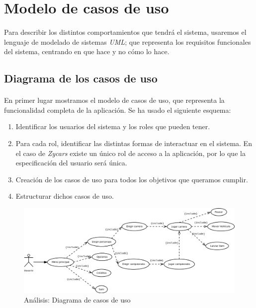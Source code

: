 \section{Modelo de casos de uso}

\paragraph{}
Para describir los distintos comportamientos que tendrá el sistema, usaremos el lenguaje de modelado de sistemas \emph{UML}; que
representa los requisitos funcionales del sistema, centrando en que hace y no cómo lo hace.

\subsection{Diagrama de los casos de uso}

\paragraph{}
En primer lugar mostramos el modelo de casos de uso, que representa la funcionalidad completa de la aplicación. Se ha usado el 
siguiente esquema:

\begin{enumerate}
    \item Identificar los usuarios del sistema y los roles que pueden tener.
    \item Para cada rol, identificar las distintas formas de interactuar en el sistema. En el caso de \emph{Zycars} existe
    un único rol de acceso a la aplicación, por lo que la especificación del usuario será única.
    \item Creación de los casos de uso para todos los objetivos que queramos cumplir.
    \item Estructurar dichos casos de uso.
\end{enumerate}

\begin{figure}[H]
  \label{diagrama_casos_uso}
  \begin{flushleft}
    \includegraphics[scale=0.45]{imagenes/analisis/diagrama_casos.png}
  \end{flushleft}
  \caption{Análisis: Diagrama de casos de uso}
\end{figure}

